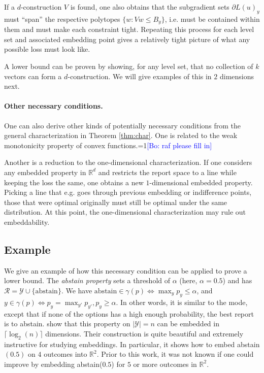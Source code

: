 \documentclass[anon,12pt]{colt2019}
\newcommand{\Comments}{1}
\newcommand{\mynote}[2]{\ifnum\Comments=1\textcolor{#1}{#2}\fi}
\newcommand{\bo}[1]{\mynote{blue}{[Bo: #1]}}
\newcommand{\reals}{\mathbb{R}}
\newcommand{\R}{\mathcal{R}}
\newcommand{\Y}{\mathcal{Y}}
\begin{document}
If a $d$-construction $V$ is found, one also obtains that the subgradient sets $\partial L(u)_y$ must ``span'' the respective polytopes $\{w : Vw \leq B_y\}$, i.e. must be contained within them and must make each constraint tight.
Repeating this process for each level set and associated embedding point gives a relatively tight picture of what any possible loss must look like.

A lower bound can be proven by showing, for any level set, that no collection of $k$ vectors can form a $d$-construction.
We will give examples of this in $2$ dimensions next.

\paragraph{Other necessary conditions.}
One can also derive other kinds of potentially necessary conditions from the general characterization in Theorem \ref{thm:char}.
One is related to the weak monotonicity property of convex functions.\bo{raf please fill in}

Another is a reduction to the one-dimensional characterization. If one considers any embedded property in $\reals^d$ and restricts the report space to a line while keeping the loss the same, one obtains a new $1$-dimensional embedded property.
Picking a line that e.g. goes through previous embedding or indifference points, those that were optimal originally must still be optimal under the same distribution.
At this point, the one-dimensional characterization may rule out embeddability.


\subsection{Example}
We give an example of how this necessary condition can be applied to prove a lower bound.
The \emph{abstain property} sets a threshold of $\alpha$ (here, $\alpha=0.5$) and has $\R = \Y \cup \{\text{abstain}\}$.
We have $\text{abstain} \in \gamma(p) \iff \max_y p_y \leq \alpha$, and $y \in \gamma(p) \iff p_y = \max_{y'} p_{y'}, p_y \geq \alpha$.
In other words, it is similar to the mode, except that if none of the options has a high enough probability, the best report is to abstain.
\citet{ramaswamy2018consistent} show that this property on $|\Y|=n$ can be embedded in $\lceil \log_2(n) \rceil$ dimensions.
Their construction is quite beautiful and extremely instructive for studying embeddings.
In particular, it shows how to embed abstain$(0.5)$ on $4$ outcomes into $\reals^2$.
Prior to this work, it was not known if one could improve by embedding abstain($0.5$) for $5$ or more outcomes in $\reals^2$.
\end{document}
